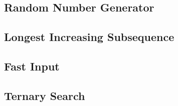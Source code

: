 \subsection{Random Number Generator}

\subsection{Longest Increasing Subsequence}

\subsection{Fast Input}

\subsection{Ternary Search}

